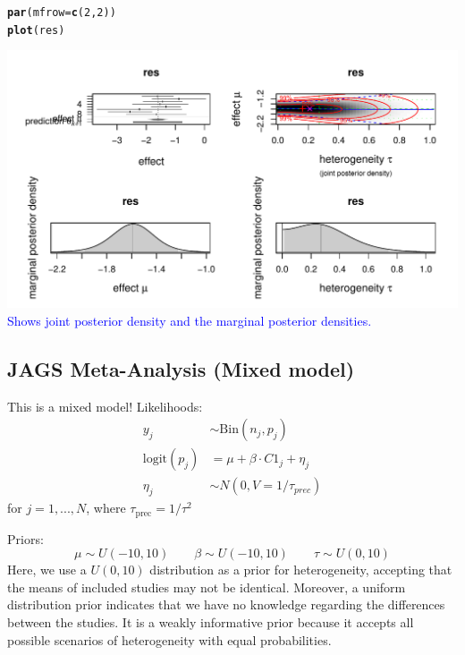 \documentclass{article}\usepackage[]{graphicx}\usepackage[]{xcolor}
\makeatletter
\def\maxwidth{ %
  \ifdim\Gin@nat@width>\linewidth
    \linewidth
  \else
    \Gin@nat@width
  \fi
}
\newcommand{\hlnum}[1]{\textcolor[rgb]{0.686,0.059,0.569}{#1}}%
\newcommand{\hlstd}[1]{\textcolor[rgb]{0.345,0.345,0.345}{#1}}%
\newcommand{\hlkwc}[1]{\textcolor[rgb]{0.333,0.667,0.333}{#1}}%
\newcommand{\hlkwd}[1]{\textcolor[rgb]{0.737,0.353,0.396}{\textbf{#1}}}%
\newenvironment{kframe}{%
 \def\at@end@of@kframe{}%
 \ifinner\ifhmode%
  \def\at@end@of@kframe{\end{minipage}}%
  \begin{minipage}{\columnwidth}%
 \fi\fi%
 \def\FrameCommand##1{\hskip\@totalleftmargin \hskip-\fboxsep
 \colorbox{shadecolor}{##1}\hskip-\fboxsep
     \hskip-\linewidth \hskip-\@totalleftmargin \hskip\columnwidth}%
 \MakeFramed {\advance\hsize-\width
   \@totalleftmargin\z@ \linewidth\hsize
   \@setminipage}}%
 {\par\unskip\endMakeFramed%
 \at@end@of@kframe}
\newenvironment{knitrout}{}{} %
\makeatother
\begin{document}
\begin{multicols*}{2}
\begin{knitrout}
\color{fgcolor}\begin{kframe}
\begin{alltt}
\hlkwd{par}\hlstd{(}\hlkwc{mfrow} \hlstd{=} \hlkwd{c}\hlstd{(}\hlnum{2}\hlstd{,}\hlnum{2}\hlstd{))}
\hlkwd{plot}\hlstd{(res)}
\end{alltt}
\end{kframe}
\includegraphics[width=\maxwidth]{figure/meta_plot-1} 
\end{knitrout}
\textcolor{blue}{Shows joint posterior density and the marginal posterior densities.}

\subsection{JAGS Meta-Analysis (Mixed model)}
This is a mixed model! Likelihoods:
\begin{align*}
y_j&\sim\text{Bin}(n_j,p_j)\\
\text{logit}(p_j)&=\mu+\beta\cdot C1_j+\eta_j\\
\eta_j&\sim N(0,V=1/\tau_{prec})
\end{align*}
for $j=1,...,N$, where $\tau_{\text{prec}}=1/\tau^2$

Priors:
$$
\mu\sim U(-10,10)\qquad \beta\sim U(-10,10)\qquad \tau\sim U(0,10)
$$
Here, we use a $U(0, 10)$ distribution as a prior for heterogeneity, accepting that the means of included studies may not be identical. Moreover, a uniform distribution prior indicates that we have no knowledge regarding the differences between the studies. It is a weakly informative prior because it accepts all possible scenarios of heterogeneity with equal probabilities.


\end{multicols*}
\end{document}
